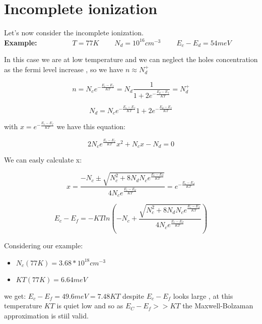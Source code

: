 
\chapter{Incomplete ionization} %
	
	\label{cha:incomplete_ionization}

	

		Let's now consider the incomplete ionization.\\
		\textbf{Example:}\ \ \ \  \ \ \ \ \ \ $T=77K \ \ \ \ \ \ \ \ \ \ N_d=10^{16} cm^{-3} \ \ \ \ \ \ \ \ \ \ E_c-E_d=54meV$

		In this case we are at low temperature and we can neglect the holes concentration as the fermi level increase , so we have $n \approx N_d^+ $

		\begin{equation}
			n=N_ce^{-\frac{E_c-E_f}{KT}}=N_d\frac{1}{1+2e^{-\frac{E_d-E_f}{KT}}}=N_d^+
		\end{equation}

		\begin{equation}
			N_d= N_ce^{-\frac{E_c-E_f}{KT}}{1+2e^{-\frac{E_d-E_f}{KT}}}
		\end{equation}

		with $x=e^{-\frac{E_c-E_f}{KT}}$ we have this equation:

		\begin{equation}
			2N_ce^{\frac{E_c-E_f}{KT}}x^2+N_cx-N_d=0
		\end{equation}

		We can easly calculate x:

		\begin{equation}
			x=\frac{-N_c \pm \sqrt{N_c^2+8N_dN_ce^{\frac{E_c-E_d}{KT}}}}{4N_ce^{\frac{E_c-E_d}{KT}}}=e^{-\frac{E_c-E_d}{KT}}
		\end{equation}

		\begin{equation}
			E_c-E_f = - KT ln \left( -N_c + \frac { \sqrt { N_c^2+ 8N_d N_c e^ { \frac {E_c-E_d} {KT} } }} {4N_ce^{\frac{E_c-E_d}{KT}}}\right)
		\end{equation}
		
		Considering our example:
		
		\begin{itemize}
			\item $N_c(77K) = 3.68*10^18 cm^{-3}$
			\item $KT(77K) = 6.64meV$
		\end{itemize}
		we get: $E_c-E_f=49.6meV=7.48KT$ despite $E_c-E_f$ looks large , at this temperature $KT$ is quiet low and so as $E_C-E_f>>KT$ the Maxwell-Bolzaman approximation is stiil valid.

